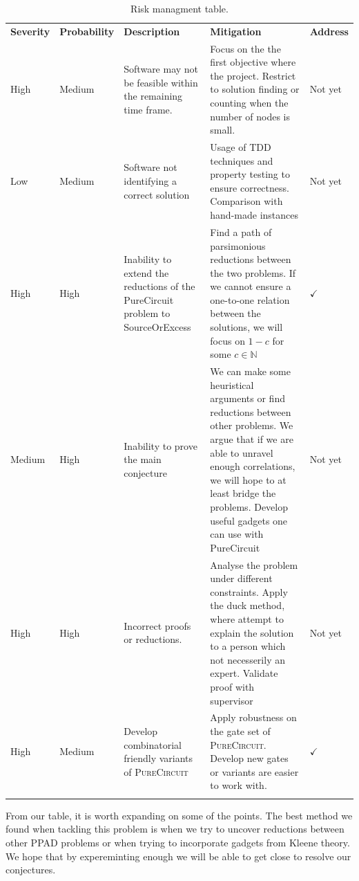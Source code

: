 \begin{xltabular}{0.95\linewidth}{|Z{1.2cm}|Z{1.75cm}|Y|Y|Z{1.2cm}|}
        \hline
        \textbf{Severity} & \textbf{Probability} & \textbf{Description} & \textbf{Mitigation} & \textbf{Address} \\
        \hhline{|=|=|=|=|=|}
        High   & Medium & Software may not be feasible within the remaining time frame. & Focus on the the first objective where the project. Restrict to solution finding or counting when the number of nodes is small. & Not yet      \\ \hline
        Low    & Medium & Software not identifying a correct solution & Usage of TDD techniques and property testing to ensure correctness.  Comparison with hand-made instances & Not yet      \\ \hline
        High   & High   & Inability to extend the reductions of the PureCircuit problem to SourceOrExcess & Find a path of parsimonious reductions between the two problems. If we cannot ensure a one-to-one relation between the solutions, we will focus on $1-c$ for some $c \in \mathbb{N}$  & $\checkmark$ \\ \hline
        Medium & High   & Inability to prove the main conjecture & We can make some heuristical arguments or find reductions between other problems. We argue that if we are able to unravel enough correlations, we will hope to at least bridge the problems. Develop useful gadgets one can use with PureCircuit & Not yet     \\ \hline
        High   & High   & Incorrect proofs or reductions. & Analyse the problem under different constraints. Apply the duck method, where attempt to explain the solution to a person which not necesserily an expert. Validate proof with supervisor & Not yet  \\ \hline
        High   & Medium & Develop combinatorial friendly variants of \textsc{PureCircuit} & Apply robustness on the gate set of \textsc{PureCircuit}. Develop new gates or variants are easier to work with.  & $\checkmark$  \\ \hline
        \caption{Risk managment table.} \label{tab:management:risk-management}
\end{xltabular}


From our table, it is worth expanding on some of the points. The best method
we found when tackling this problem is when we try to uncover reductions between other
PPAD problems or when trying to incorporate gadgets from Kleene theory. We hope
that by expereminting enough we will be able to get close to resolve our conjectures.

